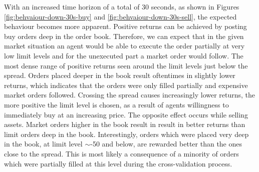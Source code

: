With an increased time horizon of a total of 30 seconds, as shown in Figures \ref{fig:behvaiour-down-30s-buy} and \ref{fig:behvaiour-down-30s-sell}, the expected behaviour becomes more apparent.
Positive returns can be achieved by posting buy orders deep in the order book.
Therefore, we can expect that in the given market situation an agent would be able to execute the order partially at very low limit levels and for the unexecuted part a market order would follow.
The most dense range of positive returns seen around the limit levels just below the spread.
Orders placed deeper in the book result oftentimes in slightly lower returns, which indicates that the orders were only filled partially and expensive market orders followed.
Crossing the spread causes increasingly lower returns, the more positive the limit level is chosen, as a result of agents willingness to immediately buy at an increasing price.
The opposite effect occurs while selling assets.
Market orders higher in the book result in result in better returns than limit orders deep in the book.
Interestingly, orders which were placed very deep in the book, at limit level $\sim$-50 and below, are rewarded better than the ones close to the spread.
This is most likely a consequence of a minority of orders which were partially filled at this level during the cross-validation process.


